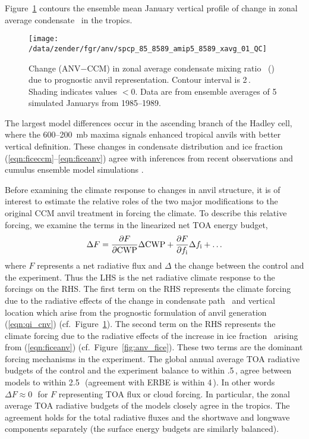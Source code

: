 \documentclass[twoside,agupp]{aguplus}
\begin{document}
Figure~\ref{fig:xavg_8589_QC} contours the ensemble mean January
vertical profile of change in zonal average condensate \qc\ in 
the tropics.  
\begin{figure}
\begin{center}
\texttt{[image: /data/zender/fgr/anv/spcp\_85\_8589\_amip5\_8589\_xavg\_01\_QC]}\vfill
\end{center}
\caption{
Change (ANV$-$CCM) in zonal average condensate mixing ratio \qc\
(\mgxkg) due to prognostic anvil representation.
Contour interval is 2\,\mgxkg.
Shading indicates values $< 0$.
Data are from ensemble averages of 5 simulated Januarys from
1985--1989.
\label{fig:xavg_8589_QC}}   
\end{figure}
The largest model differences occur in the ascending branch of
the Hadley cell, where the 600--200~mb maxima signals enhanced
tropical anvils with better vertical definition.
These changes in condensate distribution and ice fraction
(\ref{eqn:ficeccm}--\ref{eqn:ficeanv}) agree with inferences from
recent observations \cite[]{WSS931,GrM96,McH96,McH971} and cumulus
ensemble model simulations \cite[]{SLT94,GMK96}.  

Before examining the climate response to changes in anvil structure,
it is of interest to estimate the relative roles of the two major
modifications to the original CCM anvil treatment in forcing the
climate.
To describe this relative forcing, we examine the terms in the
linearized net TOA energy budget, 
\begin{equation}
\label{eqn:ss}
\Delta F = {\partial F \over \partial \CWP} \Delta \CWP +
{\partial F \over \partial \fice} \Delta \fice + \ldots
\end{equation}
where $F$ represents a net radiative flux and $\Delta$ the change
between the control and the experiment.
Thus the LHS is the net radiative climate response to the forcings on
the RHS.
The first term on the RHS represents the climate forcing due to the
radiative effects of the change in condensate path \CWP\ and vertical
location which arise from the prognostic formulation of anvil 
generation (\ref{eqn:qi_cnv}) (cf.\ Figure~\ref{fig:xavg_8589_QC}).
The second term on the RHS represents the climate forcing due to the
radiative effects of the increase in ice fraction \fice\ arising from 
(\ref{eqn:ficeanv}) (cf.\ Figure~\ref{fig:anv_fice}). 
These two terms are the dominant forcing mechanisms in the experiment.
The global annual average TOA radiative budgets of the control and the
experiment balance to within .5\,\wxmS, agree between models to
within 2.5\,\wxmS\ (agreement with ERBE is within 4\,\wxmS). 
In other words $\Delta F \approx 0$\,\wxmS\ for $F$ representing TOA
flux or cloud forcing. 
In particular, the zonal average TOA radiative budgets of the models
closely agree in the tropics.
The agreement holds for the total radiative fluxes and the shortwave
and longwave components separately (the surface energy budgets are
similarly balanced). 
\end{document}

